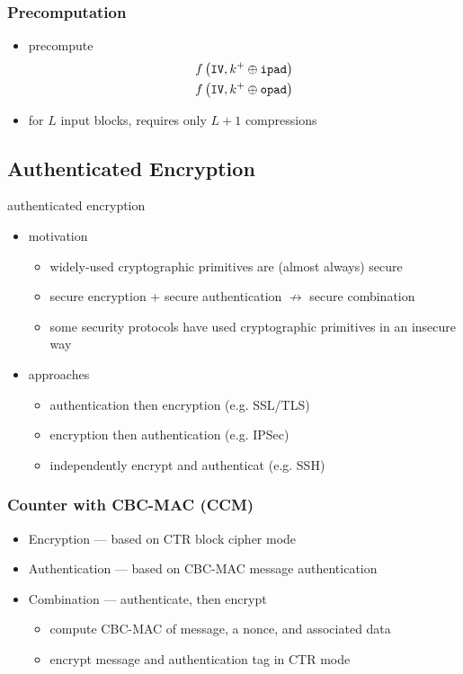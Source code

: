 \documentclass[final]{article}
\begin{document}
\subsubsection*{Precomputation}
\begin{itemize}[nosep]
    \item precompute
          \begin{align*}
               & f\left(\texttt{IV}, k^+ \oplus \texttt{ipad}\right) \\
               & f\left(\texttt{IV}, k^+ \oplus \texttt{opad}\right)
          \end{align*}
    \item for $L$ input blocks, requires only $L+1$ compressions
\end{itemize}
\subsection{Authenticated Encryption}
\glsdesc{authenticated encryption}
\begin{itemize}[nosep]
    \item motivation
          \begin{itemize}[nosep]
              \item widely-used cryptographic primitives are (almost always) secure
              \item secure encryption + secure authentication $\not\rightarrow$ secure combination
              \item some security protocols have used cryptographic primitives in an insecure way
          \end{itemize}
    \item approaches
          \begin{itemize}[nosep]
              \item authentication then encryption (e.g. SSL/TLS)
              \item encryption then authentication (e.g. IPSec)
              \item independently encrypt and authenticat (e.g. SSH)
          \end{itemize}
\end{itemize}
\subsubsection{Counter with CBC-MAC (CCM)}
\begin{itemize}[nosep]
    \item Encryption --- based on CTR block cipher mode
    \item Authentication --- based on CBC-MAC message authentication
    \item Combination --- authenticate, then encrypt
          \begin{itemize}[nosep]
              \item compute CBC-MAC of message, a nonce, and associated data
              \item encrypt message and authentication tag in CTR mode
          \end{itemize}
\end{itemize}
\end{document}
